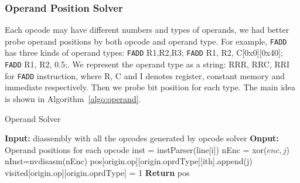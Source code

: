 \subsubsection{Operand Position Solver}
Each opcode may have different numbers and types of operands, we had better probe operand positions by both opcode and operand type. 
For example, {\tt FADD} has three kinds of operand types: {\tt FADD} R1,R2,R3; {\tt FADD} R1, R2,
C[0x0][0x40]; {\tt FADD} R1, R2, 0.5;. We represent the operand type as a string:
RRR, RRC, RRI for {\tt FADD} instruction, where R, C and I denotes register, constant
memory and immediate respectively. Then we probe bit position for each type.
The main idea is shown in Algorithm~\ref{algo:operand}.
\begin{algorithm}[htbp]
      \caption{Operand Solver}\label{algo:operand}
  \begin{algorithmic}[1]
      \State \textbf {Input:} diassembly with all the opcodes generated by opcode solver
      \State \textbf {Onput:} Operand positions for each opcode
      \State inst = instParser(line[i])
      \State nEnc = xor($enc, j$)
      \State nInst=nvdisasm(nEnc)
      \State pos[origin.op][origin.oprdType][ith].append(j)
      \State visited[origin.op][origin.oprdType] = 1
      \EndIf
      \EndFor
      \EndFor
      \State \textbf{Return} pos %
  \end{algorithmic}
\end{algorithm}
